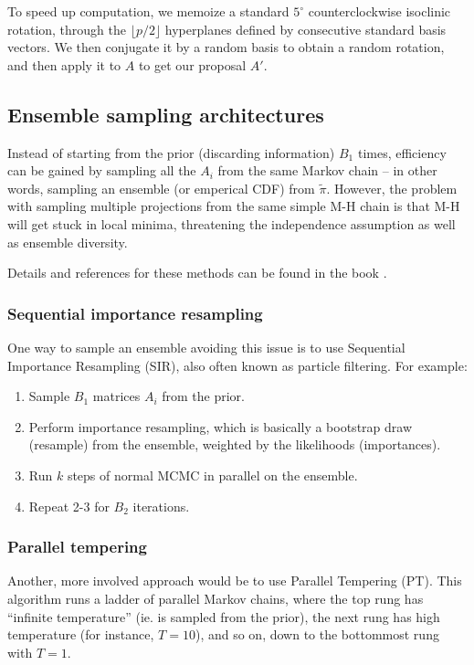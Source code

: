 \documentclass[ejs,preprint]{imsart}
\begin{document}
To speed up computation, we memoize a standard $5^\circ$ counterclockwise isoclinic rotation, through the $\lfloor p/2 \rfloor$ hyperplanes defined by consecutive standard basis vectors. We then conjugate it by a random basis to obtain a random rotation, and then apply it to $A$ to get our proposal $A'$.

\subsection{Ensemble sampling architectures}

Instead of starting from the prior (discarding information) $B_1$ times, efficiency can be gained by sampling all the $A_i$ from the same Markov chain -- in other words, sampling an ensemble (or emperical CDF) from $\tilde\pi$. However, the problem with sampling multiple projections from the same simple M-H chain is that M-H will get stuck in local minima, threatening the independence assumption as well as ensemble diversity.

Details and references for these methods can be found in the book \cite{LLC10}.

\subsubsection{Sequential importance resampling}

One way to sample an ensemble avoiding this issue is to use Sequential Importance Resampling (SIR), also often known as particle filtering. For example:
\begin{enumerate}
	\item Sample $B_1$ matrices $A_i$ from the prior.
	\item Perform importance resampling, which is basically a bootstrap draw (resample) from the ensemble, weighted by the likelihoods (importances).
	\item Run $k$ steps of normal MCMC in parallel on the ensemble.
	\item Repeat 2-3 for $B_2$ iterations.
\end{enumerate}

\subsubsection{Parallel tempering}

Another, more involved approach would be to use Parallel Tempering (PT). This algorithm runs a ladder of parallel Markov chains, where the top rung has ``infinite temperature'' (ie. is sampled from the prior), the next rung has high temperature (for instance, $T=10$), and so on, down to the bottommost rung with $T=1$.
\end{document}
